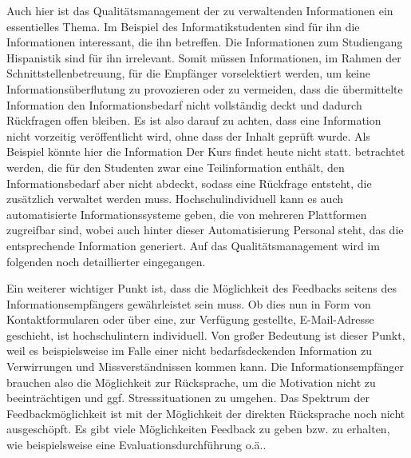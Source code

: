 Auch hier ist das Qualitätsmanagement der zu verwaltenden Informationen ein essentielles Thema. 
Im Beispiel des Informatikstudenten sind für ihn die Informationen interessant, die ihn betreffen. 
Die Informationen zum Studiengang \glqq Hispanistik\grqq{} sind für ihn irrelevant. 
Somit müssen Informationen, im Rahmen der Schnittstellenbetreuung, für die Empfänger vorselektiert 
werden, um keine Informationsüberflutung zu provozieren oder zu vermeiden, dass die übermittelte 
Information den Informationsbedarf nicht vollständig deckt und dadurch Rückfragen offen bleiben. 
Es ist also darauf zu achten, dass eine Information nicht vorzeitig veröffentlicht wird, ohne dass der 
Inhalt geprüft wurde. Als Beispiel könnte hier die Information \glqq Der Kurs findet heute nicht statt.\grqq{}
betrachtet werden, die für den Studenten zwar eine Teilinformation enthält, den Informationsbedarf 
aber nicht abdeckt, sodass eine Rückfrage entsteht, die zusätzlich verwaltet werden muss. 
Hochschulindividuell kann es auch automatisierte Informationssysteme geben, die von mehreren 
Plattformen zugreifbar sind, wobei auch hinter dieser Automatisierung Personal steht, das die 
entsprechende Information generiert. Auf das Qualitätsmanagement wird im folgenden noch 
detaillierter eingegangen.

Ein weiterer wichtiger Punkt ist, dass die Möglichkeit des Feedbacks seitens des Informationsempfängers 
gewährleistet sein muss. Ob dies nun in Form von Kontaktformularen oder über eine, zur Verfügung 
gestellte, E-Mail-Adresse geschieht, ist hochschulintern individuell. 
Von großer Bedeutung ist dieser Punkt, weil es beispielsweise im Falle einer nicht bedarfsdeckenden 
Information zu Verwirrungen und Missverständnissen kommen kann. 
Die Informationsempfänger brauchen also die Möglichkeit zur Rücksprache, um die Motivation nicht zu 
beeinträchtigen und ggf. Stresssituationen zu umgehen. 
Das Spektrum der Feedbackmöglichkeit ist mit der Möglichkeit der direkten Rücksprache noch nicht 
ausgeschöpft. 
Es gibt viele Möglichkeiten Feedback zu geben bzw. zu erhalten, wie beispielsweise eine Evaluationsdurchführung o.ä..
